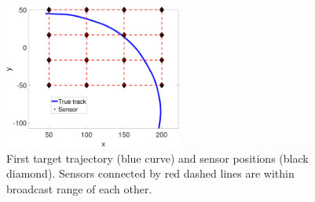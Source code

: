 \documentclass[10pt,letterpaper,final]{article}
\begin{document}
\begin{figure}
\centering
\includegraphics[width=0.52\textwidth]{Figures/track2}
\caption{First target trajectory (blue curve) and sensor positions (black diamond). Sensors connected by red dashed lines are within broadcast range of each other.}
\label{fig:track2}
\end{figure}
\end{document}
